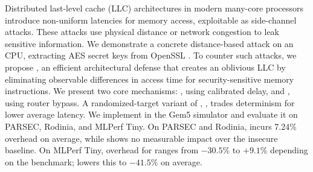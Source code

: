 Distributed last-level cache (LLC) architectures in modern many-core processors introduce non-uniform latencies for memory access, exploitable as side-channel attacks.
These attacks use physical distance or network congestion to leak sensitive information.
We demonstrate a concrete distance-based attack on an \cpumodel{} CPU, extracting AES secret keys from OpenSSL \opensslver{}.
To counter such attacks, we propose \scheme{}, an efficient architectural defense that creates an oblivious LLC by eliminating observable differences in access time for security-sensitive memory instructions.
We present two core mechanisms: \jscheme{}, using calibrated delay, and \bscheme{}, using router bypass.
A randomized-target variant of \bscheme{}, \rscheme{}, trades determinism for lower average latency.
We implement \scheme{} in the Gem5 simulator and evaluate it on PARSEC, Rodinia, and MLPerf Tiny.
On PARSEC and Rodinia, \jscheme{} incurs 7.24\% overhead on average, while \bscheme{} shows no measurable impact over the insecure baseline.
On MLPerf Tiny, overhead for \bscheme{} ranges from $-30.5\%$ to $+9.1\%$ depending on the benchmark; \rscheme{} lowers this to $-41.5\%$ on average.
